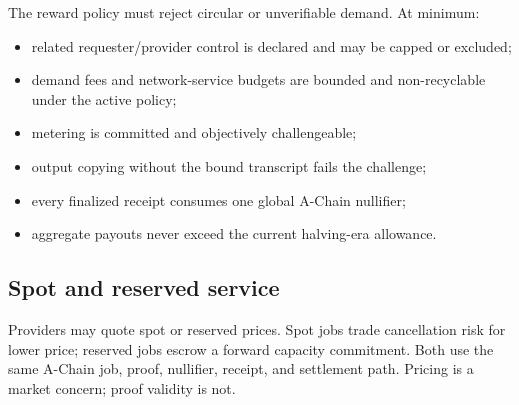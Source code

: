 The reward policy must reject circular or unverifiable demand. At minimum:

\begin{itemize}[leftmargin=1.2em]
  \item related requester/provider control is declared and may be capped or
        excluded;
  \item demand fees and network-service budgets are bounded and non-recyclable
        under the active policy;
  \item metering is committed and objectively challengeable;
  \item output copying without the bound transcript fails the challenge;
  \item every finalized receipt consumes one global A-Chain nullifier;
  \item aggregate payouts never exceed the current halving-era allowance.
\end{itemize}

\subsection{Spot and reserved service}

Providers may quote spot or reserved prices. Spot jobs trade cancellation risk
for lower price; reserved jobs escrow a forward capacity commitment. Both use
the same A-Chain job, proof, nullifier, receipt, and settlement path. Pricing is
a market concern; proof validity is not.
